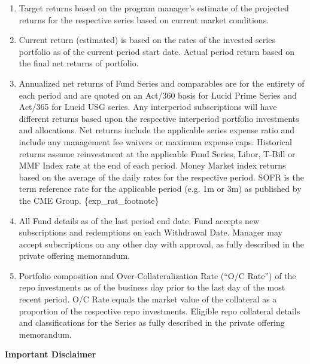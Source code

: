 \documentclass[9pt]{article}
\begin{document}
    \begin{enumerate}
        \item Target returns based on the program manager's estimate of the projected returns for the respective series based on current market conditions.

        \item Current return (estimated) is based on the rates of the invested series portfolio as of the current period start date.  Actual period return based on the final net returns of portfolio.

        \item Annualized net returns of Fund Series and comparables are for the entirety of each period and are quoted on an Act/360 basis for Lucid Prime Series and Act/365 for Lucid USG series. Any interperiod subscriptions will have different returns based upon the respective interperiod portfolio investments and allocations. Net returns include the applicable series expense ratio and include any management fee waivers or maximum expense caps. Historical returns assume reinvestment at the applicable Fund Series, Libor, T-Bill or MMF Index rate at the end of each period.  Money Market index returns based on the average of the daily rates for the respective period. SOFR is the term reference rate for the applicable period (e.g. 1m or 3m) as published by the CME Group. \{exp\_rat\_footnote\}

        \item All Fund details as of the last period end date. Fund accepts new subscriptions and redemptions on each Withdrawal Date.  Manager may accept subscriptions on any other day with approval, as fully described in the private offering memorandum.

        \item Portfolio composition and Over-Collateralization Rate (``O/C Rate'') of the repo investments as of the business day prior to the last day of the most recent period. O/C Rate equals the market value of the collateral as a proportion of the respective repo investments. Eligible repo collateral details and classifications for the Series as fully described in the private offering memorandum.

    \end{enumerate}

    \noindent\textbf{\color{lucid_blue}Important Disclaimer}

    \scriptsize
\end{document}
